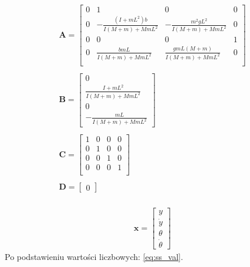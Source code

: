 \documentclass{article}
\begin{document}
\begin{equation}\label{eq:ss}
 \begin{array}{l}
  \mathbf{A} = \begin{bmatrix}  0 & 1 & 0 & 0 \\
  							   0 & -\frac{(I+mL^2)b}{I(M+m) + MmL^2} & -\frac{m^2gL^2}{I(M+m) + MmL^2} & 0 \\
  							   0 & 0 & 0 & 1 \\
  							   0 & \frac{bmL}{I(M+m) + MmL^2} & \frac{gmL(M+m)}{I(M+m) + MmL^2} & 0 \\ 
  			   \end{bmatrix} \\ \\
  			   
  \mathbf{B} = \begin{bmatrix} 0 \\ \frac{I + mL^2}{I(M+m) + MmL^2} \\ 0 \\ -\frac{mL}{I(M+m) + MmL^2} \end{bmatrix} \\ \\
  
  \mathbf{C} = \begin{bmatrix}  1 & 0 & 0 & 0 \\
  							   0 & 1 & 0 & 0 \\
  							   0 & 0 & 1 & 0 \\
  							   0 & 0 & 0 & 1 \\ 
  			   \end{bmatrix} \\ \\
  
  \mathbf{D} = \begin{bmatrix} 0 \end{bmatrix} \\
\end{array}
\end{equation}

\begin{equation}\label{eq:sv}
 \begin{array}{l}
	\mathbf{x} = 
	\begin{bmatrix} 
	  y \\ \dot{y} \\ \theta \\ \dot{\theta} 
	\end{bmatrix} 
 \end{array}
\end{equation}
Po podstawieniu wartości liczbowych: \ref{eq:ss_val}.
\end{document}
